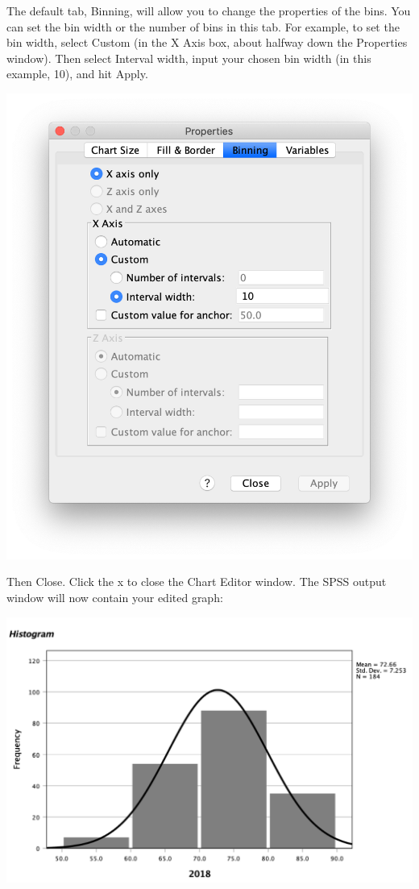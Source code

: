 \documentclass[
]{book}
\begin{document}
The default tab, {Binning}, will allow you to change the properties of the bins. You can set the bin width or the number of bins in this tab. For example, to set the bin width, select {Custom} (in the X Axis box, about halfway down the Properties window). Then select {Interval width}, input your chosen bin width (in this example, {10}), and hit {Apply}.

\includegraphics{img/2.4.29.png}

Then {Close}. Click the x to close the Chart Editor window. The SPSS output window will now contain your edited graph:

\includegraphics{img/2.4.30.png}
\end{document}
